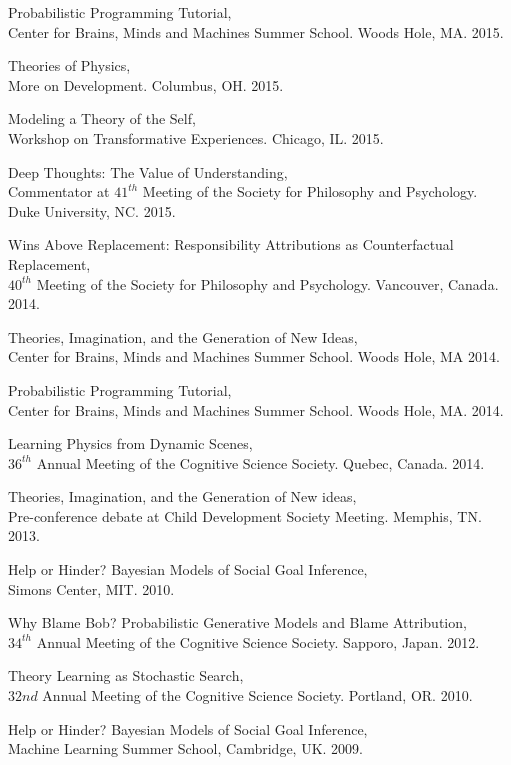 \documentclass[margin,line,pifont,palatino,courier]{res}
\begin{document}
\begin{resume}
Probabilistic Programming Tutorial, \\ Center for Brains, Minds and Machines Summer School. Woods Hole, MA. 2015.

Theories of Physics, \\More on Development. Columbus, OH. 2015.

Modeling a Theory of the Self, \\Workshop on Transformative Experiences. Chicago, IL. 2015.

Deep Thoughts: The Value of Understanding,\\ Commentator at $41^{th}$ Meeting of the Society for Philosophy and Psychology. Duke University, NC. 2015.

Wins Above Replacement: Responsibility Attributions as Counterfactual Replacement,\\ $40^{th}$ Meeting of the Society for Philosophy and Psychology. Vancouver, Canada. 2014.

Theories, Imagination, and the Generation of New Ideas, \\Center for Brains, Minds and Machines Summer School. Woods Hole, MA 2014.

Probabilistic Programming Tutorial, \\ Center for Brains, Minds and Machines Summer School. Woods Hole, MA. 2014.

Learning Physics from Dynamic Scenes, \\$36^{th}$ Annual Meeting of the Cognitive Science Society. Quebec, Canada. 2014.

Theories, Imagination, and the Generation of New ideas,\\ Pre-conference debate at Child Development Society Meeting. Memphis, TN. 2013.

Help or Hinder? Bayesian Models of Social Goal Inference,\\ Simons Center, MIT. 2010.

Why Blame Bob? Probabilistic Generative Models and Blame Attribution,\\ $34^{th}$ Annual Meeting of the Cognitive Science Society. Sapporo, Japan. 2012.

Theory Learning as Stochastic Search,\\ $32nd$ Annual Meeting of the Cognitive Science Society. Portland, OR. 2010.

Help or Hinder? Bayesian Models of Social Goal Inference,\\ Machine Learning Summer School, Cambridge, UK. 2009.


\end{resume}
\end{document}
